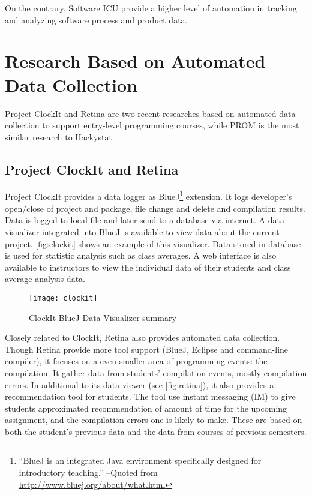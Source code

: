 On the contrary, Software ICU provide a higher level of automation in tracking and analyzing software process and product data.


\section {Research Based on Automated Data Collection}
Project ClockIt and Retina are two recent researches based on automated data collection to support entry-level programming courses, while PROM is the most similar research to Hackystat.

\subsection {Project ClockIt and Retina}
Project ClockIt provides a data logger as BlueJ\footnote{``BlueJ is an integrated Java environment specifically designed for introductory teaching.'' --Quoted from \url{http://www.bluej.org/about/what.html}}
 extension. It logs developer's open/close of project and package, file change and delete and compilation results. Data is logged to local file and later send to a database via internet. A data visualizer integrated into BlueJ is available to view data about the current project. \autoref{fig:clockit} shows an example of this visualizer. Data stored in database is used for statistic analysis such as class averages. A web interface is also available to instructors to view the individual data of their students and class average analysis data.

\begin{figure}[htbp] %
   \centering
   \texttt{[image: clockit]} 
   \caption{ClockIt BlueJ Data Visualizer summary}
   \label{fig:clockit}
\end{figure}

Closely related to ClockIt, Retina also provides automated data collection. Though Retina provide more tool support (BlueJ, Eclipse and command-line compiler), it focuses on a even smaller area of programming events: the compilation. It gather data from students' compilation events, mostly compilation errors. In additional to its data viewer (see \autoref{fig:retina}), it also provides a recommendation tool for students. The tool use instant messaging (IM) to give students approximated recommendation of amount of time for the upcoming assignment, and the compilation errors one is likely to make. These are based on both the student's previous data and the data from courses of previous semesters. 

